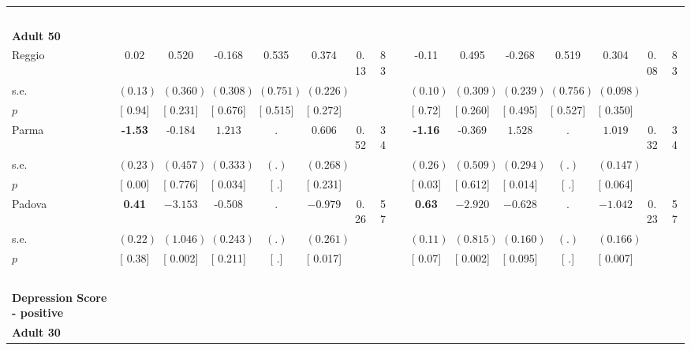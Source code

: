 \begin{longtable}{L{8em} c c c c c c c p{1em} c c c c c c c}
~\\[1em]
\quad \quad \textbf{Adult 50} & & & & & & & & & & & & & & & \\* 
\quad \quad \quad Reggio& 0.02 &     0.520 &    -0.168 &     0.535 &     0.374 &      0.13 &        83 & & -0.11 &     0.495 &    -0.268 &     0.519 &     0.304 &      0.08 &        83  \\*
\quad \quad \quad \quad s.e.& $ (     0.13)$ & $ (    0.360)$ & $ (    0.308)$ & $ (    0.751)$ & $ (    0.226)$ & & & & $ (     0.10)$ & $ (    0.309)$ & $ (    0.239)$ & $ (    0.756)$ & $ (    0.098)$ & &  \\*
\quad \quad \quad \quad $ p$ & [     0.94] & [    0.231] & [    0.676] & [    0.515] & [    0.272] & & & & [     0.72] & [    0.260] & [    0.495] & [    0.527] & [    0.350] & &  \\[1em]
\quad \quad \quad Parma& \textbf{    -1.53} &    -0.184 & $ \mathbf{    1.213}$ &         . &     0.606 &      0.52 &        34 & & \textbf{    -1.16} &    -0.369 & $ \mathbf{    1.528}$ &         . & $ \mathbf{    1.019}$ &      0.32 &        34  \\*
\quad \quad \quad \quad s.e.& $ (     0.23)$ & $ (    0.457)$ & $ (    0.333)$ & $ (        .)$ & $ (    0.268)$ & & & & $ (     0.26)$ & $ (    0.509)$ & $ (    0.294)$ & $ (        .)$ & $ (    0.147)$ & &  \\*
\quad \quad \quad \quad $ p$ & [     0.00] & [    0.776] & [    0.034] & [        .] & [    0.231] & & & & [     0.03] & [    0.612] & [    0.014] & [        .] & [    0.064] & &  \\[1em]
\quad \quad \quad Padova& \textbf{     0.41} & $ \mathbf{   -3.153}$ &    -0.508 &         . & $ \mathbf{   -0.979}$ &      0.26 &        57 & & \textbf{     0.63} & $ \mathbf{   -2.920}$ & $ \mathbf{   -0.628}$ &         . & $ \mathbf{   -1.042}$ &      0.23 &        57  \\*
\quad \quad \quad \quad s.e.& $ (     0.22)$ & $ (    1.046)$ & $ (    0.243)$ & $ (        .)$ & $ (    0.261)$ & & & & $ (     0.11)$ & $ (    0.815)$ & $ (    0.160)$ & $ (        .)$ & $ (    0.166)$ & &  \\*
\quad \quad \quad \quad $ p$ & [     0.38] & [    0.002] & [    0.211] & [        .] & [    0.017] & & & & [     0.07] & [    0.002] & [    0.095] & [        .] & [    0.007] & &  \\[1em]
~\\[1em]
\textbf{Depression Score - positive} \\*
\quad \quad \textbf{Adult 30} & & & & & & & & & & & & & & & \\* 

\end{longtable}
